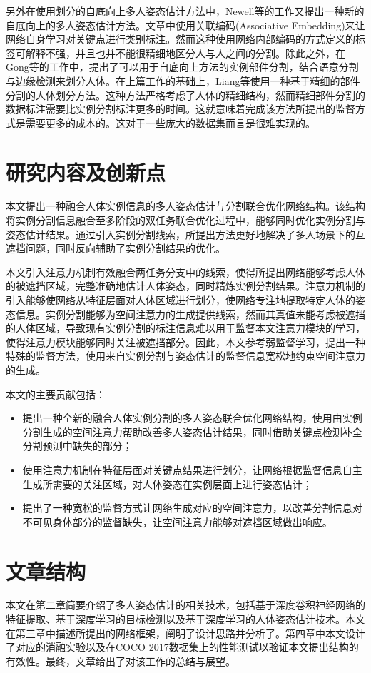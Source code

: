 另外在使用划分的自底向上多人姿态估计方法中，Newell等的工作\cite{Newell2017Associative}又提出一种新的自底向上的多人姿态估计方法。文章中使用关联编码(Associative Embedding)来让网络自身学习对关键点进行类别标注。然而这种使用网络内部编码的方式定义的标签可解释不强，并且也并不能很精细地区分人与人之间的分割。除此之外，在Gong等的工作中\cite{gong2018instance}，提出了可以用于自底向上方法的实例部件分割，结合语意分割与边缘检测来划分人体。在上篇工作的基础上，Liang等使用一种基于精细的部件分割的人体划分方法\cite{liang2019look}。这种方法严格考虑了人体的精细结构，然而精细部件分割的数据标注需要比实例分割标注更多的时间。这就意味着完成该方法所提出的监督方式是需要更多的成本的。这对于一些庞大的数据集而言是很难实现的。

\section{研究内容及创新点}
\label{sec:contribution}
本文提出一种融合人体实例信息的多人姿态估计与分割联合优化网络结构。该结构将实例分割信息融合至多阶段的双任务联合优化过程中，能够同时优化实例分割与姿态估计结果。通过引入实例分割线索，所提出方法更好地解决了多人场景下的互遮挡问题，同时反向辅助了实例分割结果的优化。


本文引入注意力机制有效融合两任务分支中的线索，使得所提出网络能够考虑人体的被遮挡区域，完整准确地估计人体姿态，同时精炼实例分割结果。注意力机制的引入能够使网络从特征层面对人体区域进行划分，使网络专注地提取特定人体的姿态信息。实例分割能够为空间注意力的生成提供线索，然而其真值未能考虑被遮挡的人体区域，导致现有实例分割的标注信息难以用于监督本文注意力模块的学习，使得注意力模块能够同时关注被遮挡部分。因此，本文参考弱监督学习\cite{10.1093/nsr/nwx106}，提出一种特殊的监督方法，使用来自实例分割与姿态估计的监督信息宽松地约束空间注意力的生成。


本文的主要贡献包括：
\begin{itemize}
	\item 提出一种全新的融合人体实例分割的多人姿态联合优化网络结构，使用由实例分割生成的空间注意力帮助改善多人姿态估计结果，同时借助关键点检测补全分割预测中缺失的部分；
	\item 使用注意力机制在特征层面对关键点结果进行划分，让网络根据监督信息自主生成所需要的关注区域，对人体姿态在实例层面上进行姿态估计；
	\item 提出了一种宽松的监督方式让网络生成对应的空间注意力，以改善分割信息对不可见身体部分的监督缺失，让空间注意力能够对遮挡区域做出响应。
\end{itemize}

\section{文章结构}
\label{sec:introconclusion}
本文在第二章简要介绍了多人姿态估计的相关技术，包括基于深度卷积神经网络的特征提取、基于深度学习的目标检测以及基于深度学习的人体姿态估计技术。本文在第三章中描述所提出的网络框架，阐明了设计思路并分析了。第四章中本文设计了对应的消融实验以及在COCO 2017数据集上的性能测试以验证本文提出结构的有效性。最终，文章给出了对该工作的总结与展望。